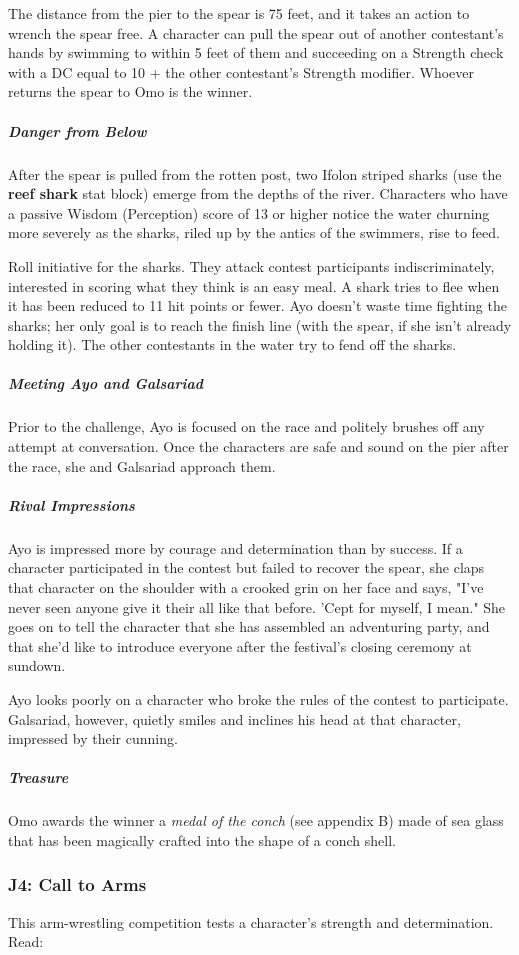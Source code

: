 \documentclass[10pt,a4paper,twoside,bg=print,twocolumn,openany,nodeprecatedcode]{dndbook}
\begin{document}
The distance from the pier to the spear is 75 feet, and it takes an action to wrench the spear free. A character can pull the spear out of another contestant's hands by swimming to within 5 feet of them and succeeding on a Strength check with a DC equal to 10 + the other contestant's Strength modifier. Whoever returns the spear to Omo is the winner.

\subparagraph{Danger from Below}
After the spear is pulled from the rotten post, two Ifolon striped sharks (use the \textbf{reef shark} stat block) emerge from the depths of the river. Characters who have a passive Wisdom (Perception) score of 13 or higher notice the water churning more severely as the sharks, riled up by the antics of the swimmers, rise to feed.

Roll initiative for the sharks. They attack contest participants indiscriminately, interested in scoring what they think is an easy meal. A shark tries to flee when it has been reduced to 11 hit points or fewer. Ayo doesn't waste time fighting the sharks; her only goal is to reach the finish line (with the spear, if she isn't already holding it). The other contestants in the water try to fend off the sharks.

\subparagraph{Meeting Ayo and Galsariad}
Prior to the challenge, Ayo is focused on the race and politely brushes off any attempt at conversation. Once the characters are safe and sound on the pier after the race, she and Galsariad approach them.

\subparagraph{Rival Impressions}
Ayo is impressed more by courage and determination than by success. If a character participated in the contest but failed to recover the spear, she claps that character on the shoulder with a crooked grin on her face and says, "I've never seen anyone give it their all like that before. 'Cept for myself, I mean." She goes on to tell the character that she has assembled an adventuring party, and that she'd like to introduce everyone after the festival's closing ceremony at sundown.

Ayo looks poorly on a character who broke the rules of the contest to participate. Galsariad, however, quietly smiles and inclines his head at that character, impressed by their cunning.

\subparagraph{Treasure}
Omo awards the winner a \textit{medal of the conch} (see appendix B) made of sea glass that has been magically crafted into the shape of a conch shell.

\subsubsection{J4: Call to Arms}
This arm-wrestling competition tests a character's strength and determination. Read:
\end{document}
